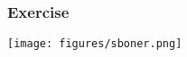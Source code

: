 \documentclass{beamer}
\newcommand{\si}[1]{\hspace{.5cm} \textcolor{gray} {#1}\\}
\newcommand{\sicont}[1]{\hspace{1cm} \textcolor{gray} {#1}\\}
\begin{document}
{\begin{frame}[t]
\frametitle{Exercise}
\begin{center}
\texttt{[image: figures/sboner.png]}
\end{center}
\end{frame}

}
\end{document}
